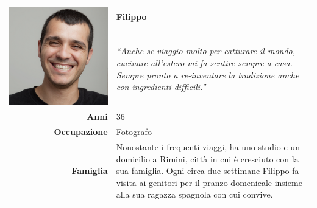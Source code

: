 \begin{table}[H]
	\begin{centering}
	\begin{tabular} { | r  p{10cm} | }
		\hline
		\multirow{2}{*}{
			\begin{minipage}{.18 \textheight}
				\vspace{0.1in}
				\includegraphics[width=\linewidth]{img/personas/filippo.png}
			\end{minipage}
		}
		 & \vspace{0.1 in}\Large\textbf{Filippo} \\ 
		& \vspace{0.1 in}\large{\emph{``Anche se viaggio molto per catturare il mondo,
cucinare all'estero mi fa
		sentire sempre a casa. Sempre pronto a re-inventare la tradizione anche con
		ingredienti difficili.''}}\\[8ex] 
		\hline
		\textbf{Anni} & 36 \\ \hline
		\textbf{Occupazione} & Fotografo \\ \hline
		\textbf{Famiglia} & {Nonostante i frequenti viaggi, ha uno
studio e un domicilio a Rimini, città in cui è cresciuto con la sua
famiglia. Ogni circa due settimane Filippo fa visita ai genitori per il
pranzo domenicale insieme alla sua ragazza spagnola con cui convive.} \\

\end{tabular}
\end{centering}
\end{table}
